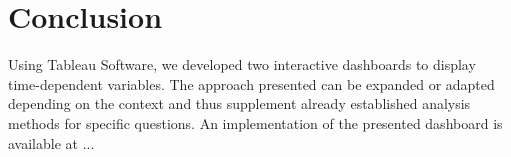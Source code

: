 \documentclass[aac,crcready]{iosart2x}
\begin{document}
\section{Conclusion}\label{s6}
Using Tableau Software, we developed two interactive dashboards to display time-dependent variables. The approach presented can be expanded or adapted depending on the context and thus supplement already established analysis methods for specific questions. An implementation of the presented dashboard is available at ...








\nocite{*} 

%
\end{document}
